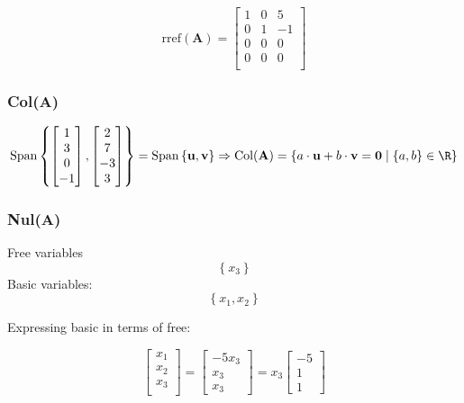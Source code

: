 \documentclass{article}
\begin{document}
\[%
    \text{rref} (\mathbf{A}) 
    =
    \begin{bmatrix} 
        1 & 0 & 5 \\
		0 & 1 & -1 \\
		0 & 0 & 0 \\
		0 & 0 & 0 \\		
    \end{bmatrix}
\]%

\subsubsection{Col(\textbf{A})} 

\[%
    \text{Span} \left\{
    \begin{bmatrix} 1\\3\\0\\-1 \end{bmatrix},
    \begin{bmatrix} 2\\7\\-3\\3 \end{bmatrix}
    \right\}
    =
    \text{Span} \left\{ 
    \mathbf{u},\mathbf{v}\right\}
    \Rightarrow 
    \text{Col}(\mathbf{A}) = 
    \left\{  
    a \cdot \mathbf{u} +
    b \cdot \mathbf{v} 
    =
    \mathbf{0}
    \mid
    \left\{ a,b \right\} \in \R
    \right\}
\]%

\subsubsection{Nul(\textbf{A})} 
Free variables
\[%
    \left\{ x_3 \right\}
\]%
Basic variables:
\[%
    \left\{ x_1, x_2 \right\}
\]%


Expressing basic in terms of free:

\[%
    \begin{bmatrix} 
        x_1 \\
		x_2 \\
		x_3 \\
    \end{bmatrix}
    =
    \begin{bmatrix} -5 x_3 \\ x_3 \\ x_3 \end{bmatrix}
    =
    x_3
    \begin{bmatrix} -5\\1\\1 \end{bmatrix}
\]%
\end{document}
